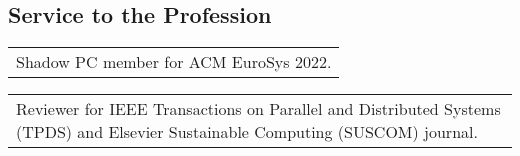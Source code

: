 \documentclass[11pt, a4paper, DIV=12]{scrartcl}
\begin{document}
	

\subsection*{Service to the Profession}

\begin{tabular}{p{14.5cm}}
Shadow PC member for ACM EuroSys 2022. \\[0.5em]
\end{tabular}

\begin{tabular}{p{14.5cm}}
Reviewer for IEEE Transactions on Parallel and Distributed Systems (TPDS) and Elsevier Sustainable
Computing (SUSCOM) journal.\\[0.5em]
\end{tabular}


\end{document}
